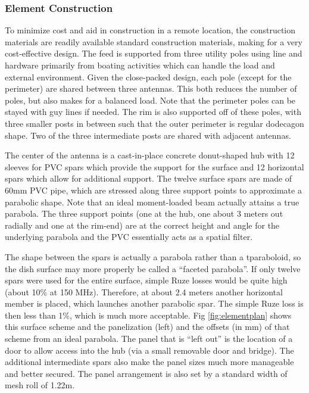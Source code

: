 \documentclass[preprint,11pt]{aastex}
\begin{document}
\subsubsection{Element Construction}
To minimize cost and aid in construction in a remote location, the construction materials are readily available standard construction materials, making for a very cost-effective design.  The feed is supported from three utility poles using line and hardware primarily from boating activities which can handle the load and external environment.  Given the close-packed design, each pole (except for the perimeter) are shared between three antennas.  This both reduces the number of poles, but also makes for a balanced load.  Note that the perimeter poles can be stayed with guy lines if needed.   The rim is also supported off of these poles, with three smaller posts in between such that the outer perimeter is regular dodecagon shape.  Two of the three intermediate posts are shared with adjacent antennas.

The center of the antenna is a cast-in-place concrete donut-shaped hub with 12 sleeves for PVC spars which provide the support for the surface and 12 horizontal spars which allow for additional support.  The twelve surface spars are made of 60mm PVC pipe, which are stressed along three support points to approximate a parabolic shape.  Note that an ideal moment-loaded beam actually attains a true parabola.  The three support points (one at the hub, one about 3 meters out radially and one at the rim-end) are at the correct height and angle for the underlying parabola and the PVC essentially acts as a spatial filter.

The shape between the spars is actually a parabola rather than a tparaboloid, so the dish surface may more properly be called a ``faceted parabola''.  If only twelve spars were used for the entire surface, simple Ruze losses would be quite high (about 10\% at 150 MHz).  Therefore, at about 2.4 meters another horizontal member is placed, which launches another parabolic spar.  The simple Ruze loss is then less than 1\%, which is much more acceptable.  Fig \ref{fig:elementplan} shows this surface scheme and the panelization (left) and the offsets (in mm) of that scheme from an ideal parabola.  The panel that is ``left out'' is the location of a door to allow access into the hub (via a small removable door and bridge).  The additional intermediate spars also make the panel sizes much more manageable and better secured.  The panel arrangement is also set by a standard width of mesh roll of 1.22m.
\end{document}
